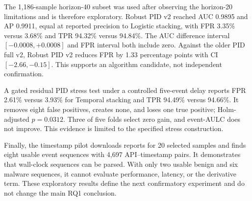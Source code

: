 The 1,186-sample horizon-40 subset was used after observing the horizon-20
limitations and is therefore exploratory. Robust PID v2 reached AUC 0.9895 and
AP 0.9911, equal at reported precision to Logistic stacking, with FPR 3.35\%
versus 3.68\% and TPR 94.32\% versus 94.84\%. The AUC difference interval
$[-0.0008,+0.0008]$ and FPR interval both include zero. Against the older PID
full v2, Robust PID v2 reduces FPR by 1.33 percentage points with CI
$[-2.66,-0.15]$. This supports an algorithm candidate, not independent
confirmation.

A gated residual PID stress test under a controlled five-event delay reports FPR
2.61\% versus 3.93\% for Temporal stacking and TPR 94.49\% versus 94.66\%.
It removes eight false positives, creates none, and loses one true positive;
Holm-adjusted $p=0.0312$. Three of five folds select zero gain, and event-AULC
does not improve. This evidence is limited to the specified stress construction.

Finally, the timestamp pilot downloads reports for 20 selected samples and finds
eight usable event sequences with 4,697 API--timestamp pairs. It demonstrates
that wall-clock sequences can be parsed. With only two usable benign and six
malware sequences, it cannot evaluate performance, latency, or the derivative
term. These exploratory results define the next confirmatory experiment and do
not change the main RQ1 conclusion.
